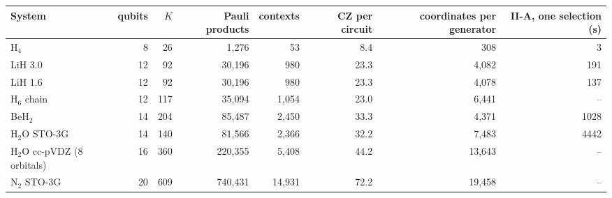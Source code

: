 \begin{tabular}{@{}lrrrrrrr@{}}
\toprule
System & qubits & $K$ & Pauli products & contexts & CZ per circuit & coordinates per generator & II-A, one selection (s) \\
\midrule
H$_4$ & 8 & 26 & 1{,}276 & 53 & 8.4 & 308 & 3 \\
LiH 3.0 & 12 & 92 & 30{,}196 & 980 & 23.3 & 4{,}082 & 191 \\
LiH 1.6 & 12 & 92 & 30{,}196 & 980 & 23.3 & 4{,}078 & 137 \\
H$_6$ chain & 12 & 117 & 35{,}094 & 1{,}054 & 23.0 & 6{,}441 & -- \\
BeH$_2$ & 14 & 204 & 85{,}487 & 2{,}450 & 33.3 & 4{,}371 & 1028 \\
H$_2$O STO-3G & 14 & 140 & 81{,}566 & 2{,}366 & 32.2 & 7{,}483 & 4442 \\
H$_2$O cc-pVDZ (8 orbitals) & 16 & 360 & 220{,}355 & 5{,}408 & 44.2 & 13{,}643 & -- \\
N$_2$ STO-3G & 20 & 609 & 740{,}431 & 14{,}931 & 72.2 & 19{,}458 & -- \\
\bottomrule
\end{tabular}
